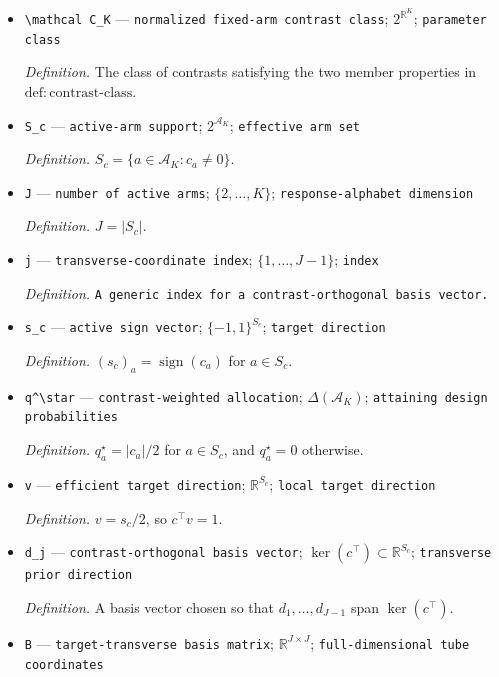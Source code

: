 \documentclass{article}
\begin{document}
\begin{itemize}
  \item \texttt{\textbackslash{}\allowbreak{}mathcal C\_\allowbreak{}K} --- \texttt{normalized fixed-\allowbreak{}arm contrast class}; \(2^{\mathbb R^K}\); \texttt{parameter class}
  \par\smallskip\noindent\emph{Definition.} The class of contrasts satisfying the two member properties in \(\mathrm{def:contrast\text{-}class}\).
  \item \texttt{S\_\allowbreak{}c} --- \texttt{active-\allowbreak{}arm support}; \(2^{\mathcal A_K}\); \texttt{effective arm set}
  \par\smallskip\noindent\emph{Definition.} \(S_c=\{a\in\mathcal A_K:c_a\ne0\}\).
  \item \texttt{J} --- \texttt{number of active arms}; \(\{2,\ldots,K\}\); \texttt{response-\allowbreak{}alphabet dimension}
  \par\smallskip\noindent\emph{Definition.} \(J=|S_c|\).
  \item \texttt{j} --- \texttt{transverse-\allowbreak{}coordinate index}; \(\{1,\ldots,J-1\}\); \texttt{index}
  \par\smallskip\noindent\emph{Definition.} \texttt{A generic index for a contrast-\allowbreak{}orthogonal basis vector.}
  \item \texttt{s\_\allowbreak{}c} --- \texttt{active sign vector}; \(\{-1,1\}^{S_c}\); \texttt{target direction}
  \par\smallskip\noindent\emph{Definition.} \((s_c)_a=\operatorname{sign}(c_a)\) for \(a\in S_c\).
  \item \texttt{q\textasciicircum{}\textbackslash{}\allowbreak{}star} --- \texttt{contrast-\allowbreak{}weighted allocation}; \(\Delta(\mathcal A_K)\); \texttt{attaining design probabilities}
  \par\smallskip\noindent\emph{Definition.} \(q_a^\star=|c_a|/2\) for \(a\in S_c\), and \(q_a^\star=0\) otherwise.
  \item \texttt{v} --- \texttt{efficient target direction}; \(\mathbb R^{S_c}\); \texttt{local target direction}
  \par\smallskip\noindent\emph{Definition.} \(v=s_c/2\), so \(c^\top v=1\).
  \item \texttt{d\_\allowbreak{}j} --- \texttt{contrast-\allowbreak{}orthogonal basis vector}; \(\ker(c^\top)\subset\mathbb R^{S_c}\); \texttt{transverse prior direction}
  \par\smallskip\noindent\emph{Definition.} A basis vector chosen so that \(d_1,\ldots,d_{J-1}\) span \(\ker(c^\top)\).
  \item \texttt{B} --- \texttt{target-\allowbreak{}transverse basis matrix}; \(\mathbb R^{J\times J}\); \texttt{full-\allowbreak{}dimensional tube coordinates}

\end{itemize}
\end{document}
